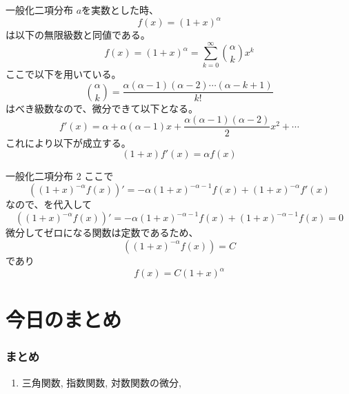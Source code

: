 

\begin{slide}{一般化二項分布}
$a$を実数とした時、
\begin{equation}
f(x) = (1+x)^{\alpha} \nonumber
\end{equation}
は以下の無限級数と同値である。
\begin{equation}
f(x) = (1+x)^{\alpha} = \sum_{k=0}^\infty \binom{\alpha}{k}x^k \label{eq:gb}
\end{equation}
ここで以下を用いている。
\begin{equation}
\binom{\alpha}{k} = \frac{\alpha(\alpha - 1)(\alpha - 2) \cdots (\alpha - k + 1)}{k!} 
\end{equation}
はべき級数なので、微分できて以下となる。
\begin{equation}
f'(x) = \alpha + \alpha(\alpha - 1) x + \frac{\alpha(\alpha -1 )(\alpha -2)}{2}x^2+\cdots 
\end{equation}
これにより以下が成立する。
\begin{equation}
(1 + x) f'(x) = \alpha f(x) \label{eq:gbcore}
\end{equation}
\end{slide}
\begin{slide}{一般化二項分布 2}
ここで
\begin{equation}
\left((1+x)^{-\alpha} f(x)\right)' = -\alpha(1+x)^{-\alpha -1} f(x) + (1+x)^{-\alpha} f'(x)
\end{equation}
なので、を代入して
\begin{equation}
\left((1+x)^{-\alpha} f(x)\right)' = -\alpha(1+x)^{-\alpha -1} f(x) + (1+x)^{-\alpha-1} f(x) = 0
\end{equation}
微分してゼロになる関数は定数であるため、
\begin{equation}
\left((1+x)^{-\alpha} f(x)\right) = C
\end{equation}
であり
\begin{equation}
f(x) = C(1+x)^{\alpha}
\end{equation}
\end{slide}

\section{今日のまとめ}
\begin{frame}
\frametitle{まとめ}   


\begin{enumerate}
\item 三角関数, 指数関数, 対数関数の微分,
\end{enumerate} 


\end{frame}
